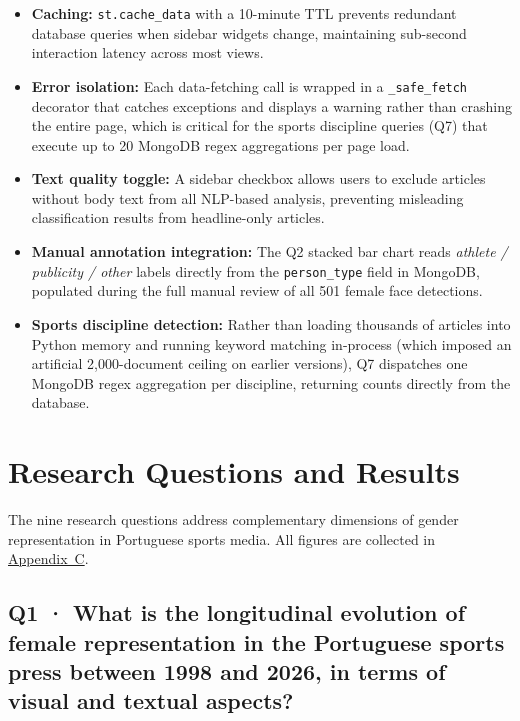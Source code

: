 \documentclass[11pt,a4paper]{article}
\begin{document}
\begin{itemize}[itemsep=2pt]
  \item \textbf{Caching:} \texttt{st.cache\_data} with a 10-minute TTL prevents redundant database queries when sidebar widgets change, maintaining sub-second interaction latency across most views.
  \item \textbf{Error isolation:} Each data-fetching call is wrapped in a \texttt{\_safe\_fetch} decorator that catches exceptions and displays a warning rather than crashing the entire page, which is critical for the sports discipline queries (Q7) that execute up to 20 MongoDB regex aggregations per page load.
  \item \textbf{Text quality toggle:} A sidebar checkbox allows users to exclude articles without body text from all NLP-based analysis, preventing misleading classification results from headline-only articles.
  \item \textbf{Manual annotation integration:} The Q2 stacked bar chart reads \textit{athlete / publicity / other} labels directly from the \texttt{person\_type} field in MongoDB, populated during the full manual review of all 501 female face detections.
  \item \textbf{Sports discipline detection:} Rather than loading thousands of articles into Python memory and running keyword matching in-process (which imposed an artificial 2{,}000-document ceiling on earlier versions), Q7 dispatches one MongoDB regex aggregation per discipline, returning counts directly from the database.
\end{itemize}

\section{Research Questions and Results}
\label{sec:results}

The nine research questions address complementary dimensions of gender representation in Portuguese sports media. All figures are collected in \hyperref[app:figures]{Appendix~C}.

\subsection[Q1 · Longitudinal evolution of female representation (1998–2026)]{Q1 · What is the longitudinal evolution of female representation in the Portuguese sports press between 1998 and 2026, in terms of visual and textual aspects?}
\end{document}
